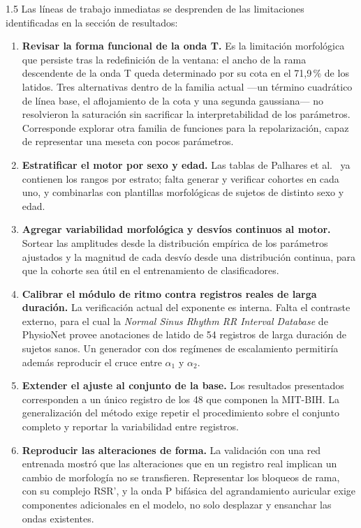 \begin{spacing}{1.5}
Las líneas de trabajo inmediatas se desprenden de las limitaciones identificadas en la sección de resultados:

\begin{enumerate}
    \item \textbf{Revisar la forma funcional de la onda T.} Es la limitación morfológica que persiste tras la redefinición de la ventana: el ancho de la rama descendente de la onda T queda determinado por su cota en el 71,9\,\% de los latidos. Tres alternativas dentro de la familia actual ---un término cuadrático de línea base, el aflojamiento de la cota y una segunda gaussiana--- no resolvieron la saturación sin sacrificar la interpretabilidad de los parámetros. Corresponde explorar otra familia de funciones para la repolarización, capaz de representar una meseta con pocos parámetros.

    \item \textbf{Estratificar el motor por sexo y edad.} Las tablas de Palhares et al.\ \cite{palhares2017normal} ya contienen los rangos por estrato; falta generar y verificar cohortes en cada uno, y combinarlas con plantillas morfológicas de sujetos de distinto sexo y edad.

    \item \textbf{Agregar variabilidad morfológica y desvíos continuos al motor.} Sortear las amplitudes desde la distribución empírica de los parámetros ajustados y la magnitud de cada desvío desde una distribución continua, para que la cohorte sea útil en el entrenamiento de clasificadores.

    \item \textbf{Calibrar el módulo de ritmo contra registros reales de larga duración.} La verificación actual del exponente es interna. Falta el contraste externo, para el cual la \emph{Normal Sinus Rhythm RR Interval Database} de PhysioNet \cite{physionet_nsr2db} provee anotaciones de latido de 54 registros de larga duración de sujetos sanos. Un generador con dos regímenes de escalamiento permitiría además reproducir el cruce entre $\alpha_1$ y $\alpha_2$.

    \item \textbf{Extender el ajuste al conjunto de la base.} Los resultados presentados corresponden a un único registro de los 48 que componen la MIT-BIH. La generalización del método exige repetir el procedimiento sobre el conjunto completo y reportar la variabilidad entre registros.

    \item \textbf{Reproducir las alteraciones de forma.} La validación con una red entrenada mostró que las alteraciones que en un registro real implican un cambio de morfología no se transfieren. Representar los bloqueos de rama, con su complejo RSR', y la onda P bifásica del agrandamiento auricular exige componentes adicionales en el modelo, no solo desplazar y ensanchar las ondas existentes.


\end{enumerate}
\end{spacing}
